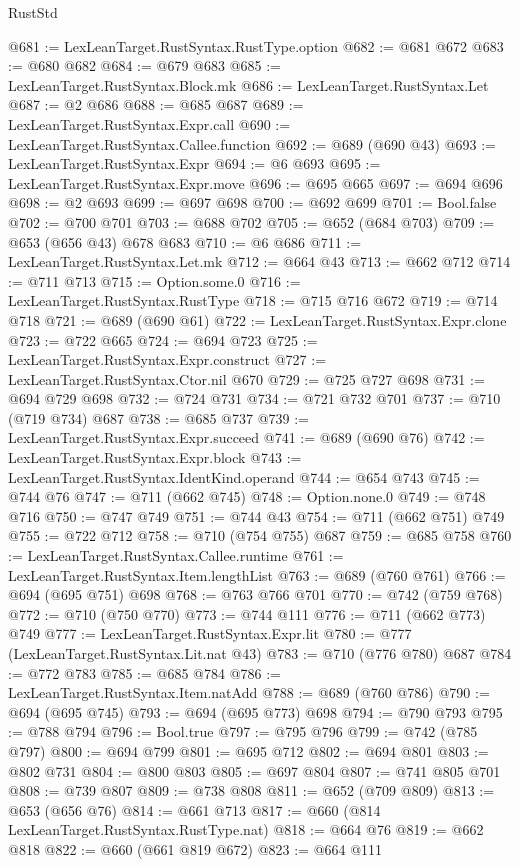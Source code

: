 \begin{lexlean}{RustStd}
\begin{coremodule}
@681 := LexLeanTarget.RustSyntax.RustType.option
@682 := @681 @672
@683 := @680 @682
@684 := @679 @683
@685 := LexLeanTarget.RustSyntax.Block.mk
@686 := LexLeanTarget.RustSyntax.Let
@687 := @2 @686
@688 := @685 @687
@689 := LexLeanTarget.RustSyntax.Expr.call
@690 := LexLeanTarget.RustSyntax.Callee.function
@692 := @689 (@690 @43)
@693 := LexLeanTarget.RustSyntax.Expr
@694 := @6 @693
@695 := LexLeanTarget.RustSyntax.Expr.move
@696 := @695 @665
@697 := @694 @696
@698 := @2 @693
@699 := @697 @698
@700 := @692 @699
@701 := Bool.false
@702 := @700 @701
@703 := @688 @702
@705 := @652 (@684 @703)
@709 := @653 (@656 @43) @678 @683
@710 := @6 @686
@711 := LexLeanTarget.RustSyntax.Let.mk
@712 := @664 @43
@713 := @662 @712
@714 := @711 @713
@715 := Option.some.{0}
@716 := LexLeanTarget.RustSyntax.RustType
@718 := @715 @716 @672
@719 := @714 @718
@721 := @689 (@690 @61)
@722 := LexLeanTarget.RustSyntax.Expr.clone
@723 := @722 @665
@724 := @694 @723
@725 := LexLeanTarget.RustSyntax.Expr.construct
@727 := LexLeanTarget.RustSyntax.Ctor.nil @670
@729 := @725 @727 @698
@731 := @694 @729 @698
@732 := @724 @731
@734 := @721 @732 @701
@737 := @710 (@719 @734) @687
@738 := @685 @737
@739 := LexLeanTarget.RustSyntax.Expr.succeed
@741 := @689 (@690 @76)
@742 := LexLeanTarget.RustSyntax.Expr.block
@743 := LexLeanTarget.RustSyntax.IdentKind.operand
@744 := @654 @743
@745 := @744 @76
@747 := @711 (@662 @745)
@748 := Option.none.{0}
@749 := @748 @716
@750 := @747 @749
@751 := @744 @43
@754 := @711 (@662 @751) @749
@755 := @722 @712
@758 := @710 (@754 @755) @687
@759 := @685 @758
@760 := LexLeanTarget.RustSyntax.Callee.runtime
@761 := LexLeanTarget.RustSyntax.Item.lengthList
@763 := @689 (@760 @761)
@766 := @694 (@695 @751) @698
@768 := @763 @766 @701
@770 := @742 (@759 @768)
@772 := @710 (@750 @770)
@773 := @744 @111
@776 := @711 (@662 @773) @749
@777 := LexLeanTarget.RustSyntax.Expr.lit
@780 := @777 (LexLeanTarget.RustSyntax.Lit.nat @43)
@783 := @710 (@776 @780) @687
@784 := @772 @783
@785 := @685 @784
@786 := LexLeanTarget.RustSyntax.Item.natAdd
@788 := @689 (@760 @786)
@790 := @694 (@695 @745)
@793 := @694 (@695 @773) @698
@794 := @790 @793
@795 := @788 @794
@796 := Bool.true
@797 := @795 @796
@799 := @742 (@785 @797)
@800 := @694 @799
@801 := @695 @712
@802 := @694 @801
@803 := @802 @731
@804 := @800 @803
@805 := @697 @804
@807 := @741 @805 @701
@808 := @739 @807
@809 := @738 @808
@811 := @652 (@709 @809)
@813 := @653 (@656 @76)
@814 := @661 @713
@817 := @660 (@814 LexLeanTarget.RustSyntax.RustType.nat)
@818 := @664 @76
@819 := @662 @818
@822 := @660 (@661 @819 @672)
@823 := @664 @111

\end{coremodule}
\end{lexlean}
